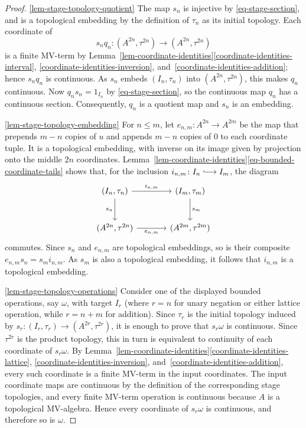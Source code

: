 \documentclass[preprint,3p]{elsarticle}
\theoremstyle{plain}
\theoremstyle{definition}
\newcommand{\longhookrightarrow}{\lhook\joinrel\longrightarrow}
\numberwithin{equation}{section}
\begin{document}
\begin{proof}
\ref{lem-stage-topology-quotient}
The map $s_n$ is injective by \eqref{eq-stage-section},
and is a topological embedding by the definition of $\tau_n$
as its initial topology.  Each coordinate of
\[
 s_nq_n\colon(A^{2n},\tau^{2n})
 \longrightarrow(A^{2n},\tau^{2n})
\]
is a finite MV-term by
Lemma~\ref{lem-coordinate-identities}\ref{coordinate-identities-interval},
\ref{coordinate-identities-inversion}, and~\ref{coordinate-identities-addition}; hence $s_nq_n$
is continuous.  As $s_n$ embeds $(I_n,\tau_n)$
into $(A^{2n},\tau^{2n})$, this makes $q_n$ continuous.
Now $q_ns_n=1_{I_n}$ by \eqref{eq-stage-section}, so the continuous map $q_n$
has a continuous section.  Consequently, $q_n$ is a
quotient map and $s_n$ is an embedding.

\ref{lem-stage-topology-embedding}
For $n\leq m$, let $e_{n,m}\colon A^{2n}\longrightarrow A^{2m}$
be the map that prepends $m-n$ copies of $u$ and
appends $m-n$ copies of $0$ to each coordinate tuple.
It is a topological embedding, with inverse on its image
given by projection onto the middle $2n$ coordinates.
Lemma~\ref{lem-coordinate-identities}\ref{eq-bounded-coordinate-tails} shows that,
for the inclusion $i_{n,m}\colon I_n\longhookrightarrow I_m$,
the diagram
\[
\begin{tikzcd}[column sep=large,row sep=large]
(I_n,\tau_n)
  \arrow[r,"i_{n,m}"]
  \arrow[d,"s_n"']
&
(I_m,\tau_m)
  \arrow[d,"s_m"]
\\
(A^{2n},\tau^{2n})
  \arrow[r,"e_{n,m}"']
&
(A^{2m},\tau^{2m})
\end{tikzcd}
\]
commutes.
Since $s_n$ and $e_{n,m}$ are topological embeddings,
so is their composite $e_{n,m}s_n=s_mi_{n,m}$.
As $s_m$ is also a topological embedding,
it follows that $i_{n,m}$ is a topological embedding.

\ref{lem-stage-topology-operations} Consider one of the displayed
bounded operations, say $\omega$, with target $I_r$ (where $r=n$ for unary
negation or either lattice operation, while $r=n+m$ for addition).  Since $\tau_r$ is
the initial topology induced by
$s_r\colon(I_r,\tau_r)\longrightarrow(A^{2r},\tau^{2r})$,
it is enough to prove that $s_r\omega$ is continuous.  Since $\tau^{2r}$
is the product topology, this in turn is equivalent to
continuity of each coordinate of $s_r\omega$.  By
Lemma~\ref{lem-coordinate-identities}\ref{coordinate-identities-lattice},
\ref{coordinate-identities-inversion}, and~\ref{coordinate-identities-addition}, every such coordinate is a finite
MV-term in the input coordinates.  The input coordinate maps are
continuous by the definition of the corresponding stage topologies, and
every finite MV-term operation is continuous because $A$ is a topological
MV-algebra.  Hence every coordinate of $s_r\omega$ is continuous, and therefore
so is $\omega$.
\end{proof}
\end{document}

